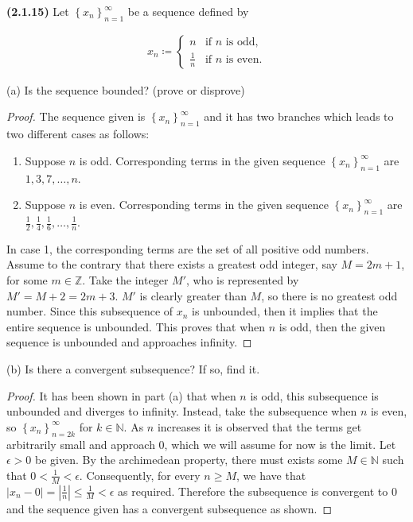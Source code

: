 \documentclass[12pt]{article}
\newcommand{\set}[1]{\left\{ {#1} \right\}}
\newcommand{\abs}[1]{\left| {#1} \right|}
\newcommand{\seq}[2][n]{\left\{ {#2} \right\}_{#1=1}^\infty}
\newcommand{\bZ}{\mathbb{Z}}
\newcommand{\bN}{\mathbb{N}}
\begin{document}
\newpage

\noindent \textbf{(2.1.15)} Let $\set{x_n}_{n=1}^\infty$ be a sequence defined by

\begin{align*}
	x_n\coloneq \begin{cases}
             n & \text{if } n \text{ is odd}, \\
             \frac{1}{n} & \text{if } n \text{ is even}.
        		\end{cases}
\end{align*}

\noindent (a) Is the sequence bounded? (prove or disprove)

\begin{proof} The sequence given is $\seq{x_n}$ and it has two branches which leads to two different cases as follows:
	\begin{enumerate}
		\item Suppose $n$ is odd. Corresponding terms in the given sequence $\seq{x_n}$ are $1,3,7,\dots,n$.
		\item Suppose $n$ is even. Corresponding terms in the given sequence $\seq{x_n}$ are $\frac{1}{2}, \frac{1}{4}, \frac{1}{6},\dots, \frac{1}{n}$.
	\end{enumerate}
	In case 1, the corresponding terms are the set of all positive odd numbers. Assume to the contrary that there exists a greatest odd integer, say $M=2m+1$, for some $m\in\bZ$. Take the integer $M'$, who is represented by $M'=M+2=2m+3$. $M'$ is clearly greater than $M$, so there is no greatest odd number. Since this subsequence of $x_n$ is unbounded, then it implies that the entire sequence is unbounded. This proves that when $n$ is odd, then the given sequence is unbounded and approaches infinity.
\end{proof}

\noindent (b) Is there a convergent subsequence? If so, find it.

\begin{proof}
	It has been shown in part (a) that when $n$ is odd, this subsequence is unbounded and diverges to infinity. Instead, take the subsequence when $n$ is even, so $\set{x_n}_{n=2k}^\infty$ for $k\in\bN$. As $n$ increases it is observed that the terms get arbitrarily small and approach 0, which we will assume for now is the limit. Let $\epsilon>0$ be given. By the archimedean property, there must exists some $M\in\bN$ such that $0<\frac{1}{M}<\epsilon$. Consequently, for every $n\ge M$, we have that $\abs{x_n-0}=\abs{\frac{1}{n}}\le \frac{1}{M}<\epsilon$ as required. Therefore the subsequence is convergent to 0 and the sequence given has a convergent subsequence as shown.
\end{proof}
\end{document}
